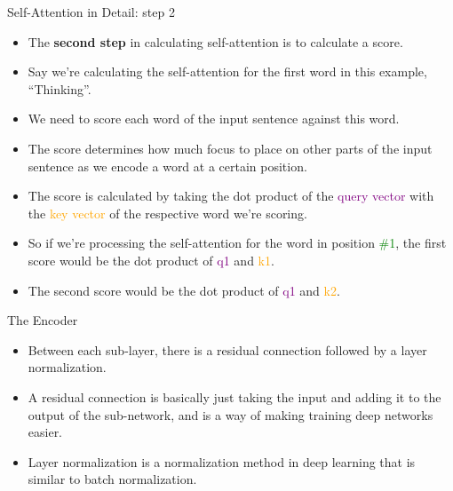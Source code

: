 \documentclass[handout]{beamer}
\begin{document}
\begin{frame}{Self-Attention in Detail: step 2}
\begin{scriptsize}



\begin{itemize}


\item The \textbf{second step} in calculating self-attention is to calculate a score. 

\item Say we’re calculating the self-attention for the first word in this example, ``Thinking''.

\item We need to score each word of the input sentence against this word. 

\item The score determines how much focus to place on other parts of the input sentence as we encode a word at a certain position.

\item The score is calculated by taking the dot product of the \textcolor{purple}{query vector} with the \textcolor{orange}{key vector} of the respective word we're scoring. 
\item So if we're processing the self-attention for the word in position \textcolor{green}{\#1}, the first score would be the dot product of \textcolor{purple}{q1} and \textcolor{orange}{k1}.
\item The second score would be the dot product of \textcolor{purple}{q1} and \textcolor{orange}{k2}.

\end{itemize}

\end{scriptsize}


\end{frame}


\begin{frame}{The Encoder}
\begin{scriptsize}
\begin{itemize}

\item Between each sub-layer, there is a residual connection followed by a layer normalization. 

\item A residual connection is basically just taking the input and adding it to the output of the sub-network, and is a way of making training deep networks easier. 

\item Layer normalization is a normalization method in deep learning that is similar to batch normalization.
 
\end{itemize}

\end{scriptsize}

\end{frame}
\end{document}
